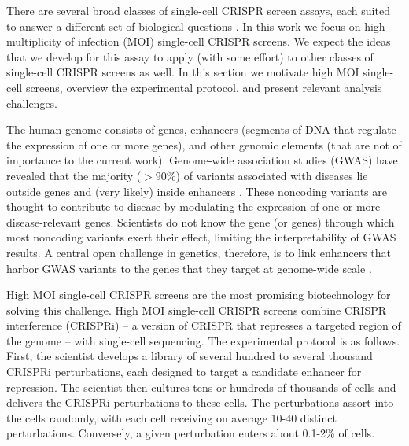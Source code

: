 \documentclass[12pt]{article}
\begin{document}
There are several broad classes of single-cell CRISPR screen assays, each suited to answer a different set of biological questions \parencite{Gasperini2019,Datlinger2021,Mimitou2019}. In this work we focus on high-multiplicity of infection (MOI) single-cell CRISPR screens. We expect the ideas that we develop for this assay to apply (with some effort) to other classes of single-cell CRISPR screens as well. In this section we motivate high MOI single-cell screens, overview the experimental protocol, and present relevant analysis challenges.

The human genome consists of genes, enhancers (segments of DNA that regulate the expression of one or more genes), and other genomic elements (that are not of importance to the current work). Genome-wide association studies (GWAS) have revealed that the majority ($>90\%$) of variants associated with diseases lie outside genes and (very likely) inside enhancers \parencite{Gallagher2018}. These noncoding variants are thought to contribute to disease by modulating the expression of one or more disease-relevant genes. Scientists do not know the gene (or genes) through which most noncoding variants exert their effect, limiting the interpretability of GWAS results. A central open challenge in genetics, therefore, is to link enhancers that harbor GWAS variants to the genes that they target at genome-wide scale \parencite{Gasperini2020}.

High MOI single-cell CRISPR screens are the most promising biotechnology for solving this challenge. High MOI single-cell CRISPR screens combine CRISPR interference (CRISPRi) -- a version of CRISPR that represses a targeted region of the genome -- with single-cell sequencing. The experimental protocol is as follows. First, the scientist develops a library of several hundred to several thousand CRISPRi perturbations, each designed to target a candidate enhancer for repression. The scientist then cultures tens or hundreds of thousands of cells and delivers the CRISPRi perturbations to these cells. The perturbations assort into the cells randomly, with each cell receiving on average 10-40 distinct perturbations. Conversely, a given perturbation enters about 0.1-2\% of cells. 
\end{document}
